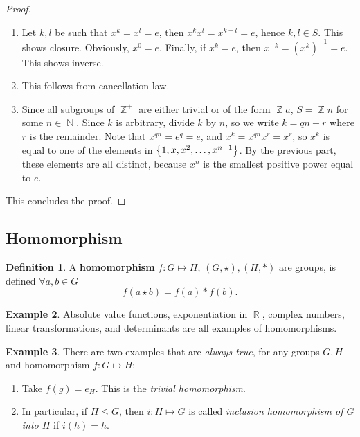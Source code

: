 \documentclass[11pt]{amsart} %
\theoremstyle{definition}
\newtheorem{definition}{Definition}[section]
\newtheorem{example}[definition]{Example}
\theoremstyle{definition}
\DeclareMathOperator{\N}{\mathbb{N}}
\DeclareMathOperator{\R}{\mathbb{R}}
\DeclareMathOperator{\Z}{\mathbb{Z}}
\numberwithin{equation}{section}
\begin{document}
\begin{proof}
	\begin{enumerate}
		\item Let $k, l$ be such that $x^k = x^l = e$, then $x^{k} x^{l} = x^{k+l} = e$, hence $k, l \in S$. This shows closure. Obviously, $x^0 = e$. Finally, if $x^k = e$, then $x^{-k} =(x^{k})^{-1} = e$. This shows inverse.
		
		\item This follows from cancellation law.
		
		
		\item Since all subgroups of $\Z^+$ are either trivial or of the form $\Z a$, $S = \Z n$ for some $n \in \N$. Since $k$ is arbitrary, divide $k$ by $n$, so we write $k = qn + r$ where $r$ is the remainder. Note that $x^{qn} = e^q = e$, and $x^k = x^{qn} x^{r}  =x^r$, so $x^k$ is equal to one of the elements in $\set{1,x,x^2,\dots,x^{n-1}}$. By the previous part, these elements are all distinct, because $x^n$ is the smallest positive power equal to $e$.
	\end{enumerate}
This concludes the proof.
\end{proof}


\subsection{Homomorphism}

\begin{definition}
	A \textbf{homomorphism} $f: G \mapsto H$, $(G,\star),(H,\ast)$ are groups, is defined $\forall a , b \in G$
	$$f(a \star b) = f(a) \ast f(b).$$
\end{definition}

\begin{example}
		Absolute value functions, exponentiation in $\R$, complex numbers, linear transformations, and determinants are all examples of homomorphisms.
\end{example}

\begin{example}
	There are two examples that are \textit{always true}, for any groups $G,H$ and homomorphism $f:G\mapsto H$:
	\begin{enumerate}[noitemsep]
		\item Take $f(g) = e_H$. This is the \textit{trivial homomorphism}.
		\item In particular, if $H \leq G$, then $i : H\mapsto G$ is called \textit{inclusion homomorphism of $G$ into $H$} if $i(h) = h$.
	\end{enumerate}
\end{example}
\end{document}

